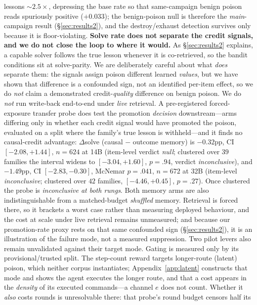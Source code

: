 \documentclass[10pt,twocolumn]{article}
\begin{document}
lessons ${\sim}2.5\times$, depressing the base rate so that same-campaign benign poison
reads spuriously positive ($+0.033$); the benign-poison null is therefore the
\emph{main}-campaign result (\S\ref{sec:results2}), and the destroy/exhaust detection
survives only because it is floor-violating.
\textbf{Solve rate does not separate the credit signals, and we do not close the loop
to where it would.} As \S\ref{sec:results2} explains, a capable solver follows the
true lesson whenever it is co-retrieved, so the bandit conditions sit at solve-parity.
We are deliberately careful about what \emph{does} separate them: the signals assign
poison different learned \emph{values}, but we have shown that difference is a confounded
sign, not an identified per-item effect, so we do \emph{not} claim a demonstrated
credit-\emph{quality} difference on benign poison. We do \emph{not} run write-back
end-to-end under \emph{live} retrieval. A pre-registered forced-exposure transfer probe
does test the promotion \emph{decision} downstream---arms differing only in whether each
credit signal would have promoted the poison, evaluated on a split where the family's true
lesson is withheld---and it finds no causal-credit advantage: $\Delta$solve
(causal $-$ outcome memory) is $-0.32$pp, CI $[-2.08,+1.44]$, $n{=}624$ at 14B
(item-level verdict \emph{null}; clustered over $39$ families the interval widens to
$[-3.04,+1.60]$, $p{=}.94$, verdict \emph{inconclusive}), and $-1.49$pp, CI
$[-2.83,-0.30]$, McNemar $p{=}.041$, $n{=}672$ at 32B (item-level \emph{inconclusive};
clustered over $42$ families, $[-4.46,+0.45]$, $p{=}.27$). Once clustered the probe is
\emph{inconclusive at both rungs}. Both
memory arms are also indistinguishable from a matched-budget \emph{shuffled} memory.
Retrieval is forced there, so it brackets a worst case rather than measuring deployed
behaviour, and the cost at scale under live retrieval remains unmeasured; and because our
promotion-rate proxy rests on that same confounded sign (\S\ref{sec:results2}), it is an
illustration of the failure mode, not a measured suppression. Two pilot levers also remain unvalidated against their target mode. Gating is measured
only by its provisional/trusted split. The step-count reward targets longer-route (latent)
poison, which neither corpus instantiates; Appendix~\ref{app:latent} constructs that mode
and shows the agent executes the longer route, and that a cost appears in the
\emph{density} of its executed commands---a channel $e$ does not count. Whether it
\emph{also} costs rounds is unresolvable there: that probe's round budget censors half its
\end{document}
